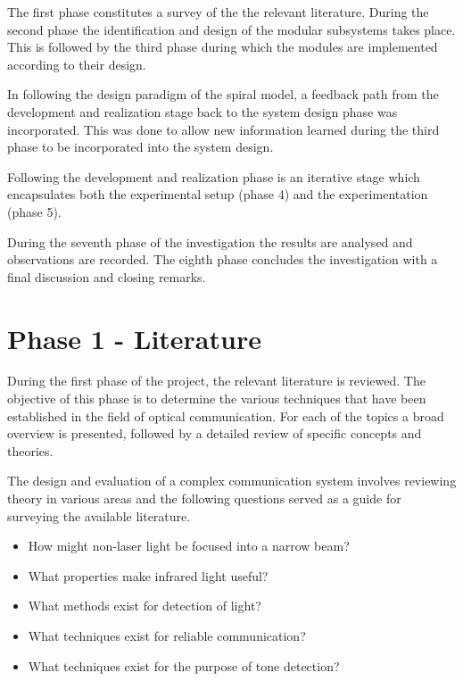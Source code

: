 The first phase constitutes a survey of the the relevant literature. During the second phase the identification and design of the modular subsystems takes place. This is followed by the third phase during which the modules are implemented according to their design.

In following the design paradigm of the spiral model, a feedback path from the development and realization stage back to the system design phase was incorporated. This was done to allow new information learned during the third phase to be incorporated into the system design.

Following the development and realization phase is an iterative stage which encapsulates both the experimental setup (phase 4) and the experimentation (phase 5).

During the seventh phase of the investigation the results are analysed and observations are recorded. The eighth phase concludes the investigation with a final discussion and closing remarks.


\section{Phase 1 - Literature}

During the first phase of the project, the relevant literature is reviewed. The objective of this phase is to determine the various techniques that have been established in the field of optical communication. For each of the topics a broad overview is presented, followed by a detailed review of specific concepts and theories.

The design and evaluation of a complex communication system involves reviewing theory in various areas and the following questions served as a guide for surveying the available literature.

\begin{itemize}
	\item How might non-laser light be focused into a narrow beam? %
	\item What properties make infrared light useful? %
	\item What methods exist for detection of light? %
	\item What techniques exist for reliable communication? %
	\item What techniques exist for the purpose of tone detection? %
\end{itemize}

